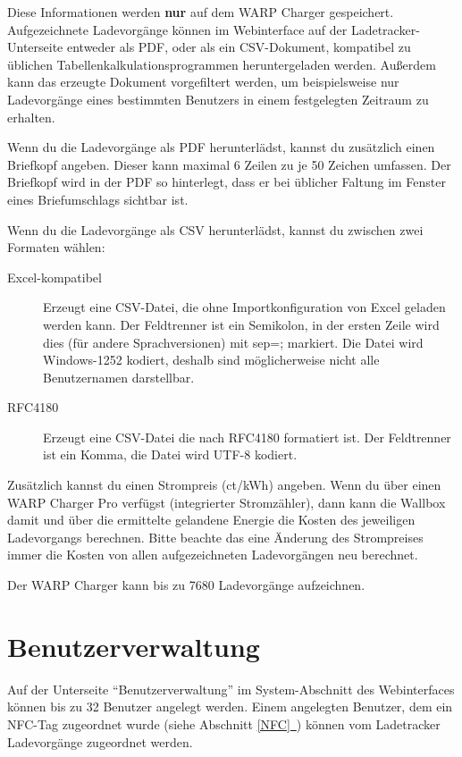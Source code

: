 \documentclass[a4paper,10pt]{article}
\newcommand*{\fullref}[1]{Abschnitt \hyperref[{#1}]{\ref*{#1}~\nameref*{#1}}}
\begin{document}
\begin{multicols*}{2}
    Diese Informationen werden \textbf{nur} auf dem WARP Charger gespeichert.
    Aufgezeichnete Ladevorgänge können im Webinterface auf der Ladetracker-Unterseite entweder als PDF, oder als ein CSV-Dokument,
    kompatibel zu üblichen Tabellenkalkulationsprogrammen heruntergeladen werden. Außerdem kann das erzeugte Dokument
    vorgefiltert werden, um beispielsweise nur Ladevorgänge eines bestimmten Benutzers in einem festgelegten Zeitraum zu erhalten.

    Wenn du die Ladevorgänge als PDF herunterlädst, kannst du zusätzlich einen Briefkopf angeben. Dieser kann maximal 6 Zeilen zu je 50 Zeichen
    umfassen. Der Briefkopf wird in der PDF so hinterlegt, dass er bei üblicher Faltung im Fenster eines Briefumschlags sichtbar ist.

    Wenn du die Ladevorgänge als CSV herunterlädst, kannst du zwischen zwei Formaten wählen:
    \begin{description}
     \item[Excel-kompatibel] Erzeugt eine CSV-Datei, die ohne Importkonfiguration von Excel geladen werden kann. Der Feldtrenner ist ein Semikolon, in der ersten Zeile wird dies (für andere Sprachversionen) mit sep=; markiert. Die Datei wird Windows-1252 kodiert, deshalb sind möglicherweise nicht alle Benutzernamen darstellbar.
     \item[RFC4180] Erzeugt eine CSV-Datei die nach RFC4180 formatiert ist. Der Feldtrenner ist ein Komma, die Datei wird UTF-8 kodiert.
    \end{description}


    Zusätzlich kannst du einen Strompreis (ct/kWh) angeben. Wenn du über einen
    WARP Charger Pro verfügst (integrierter Stromzähler), dann kann die Wallbox
    damit und über die ermittelte gelandene Energie die Kosten des jeweiligen
    Ladevorgangs berechnen. Bitte beachte das eine Änderung des Strompreises
    immer die Kosten von allen aufgezeichneten Ladevorgängen neu berechnet.

    Der WARP Charger kann bis zu 7680 Ladevorgänge aufzeichnen.

    \section{Benutzerverwaltung} \label{user_management}

    Auf der Unterseite \enquote{Benutzerverwaltung} im System-Abschnitt des Webinterfaces können bis zu 32 Benutzer angelegt werden.
    Einem angelegten Benutzer, dem ein NFC-Tag zugeordnet wurde (siehe \fullref{NFC}) können vom Ladetracker Ladevorgänge zugeordnet werden.


\end{multicols*}
\end{document}
